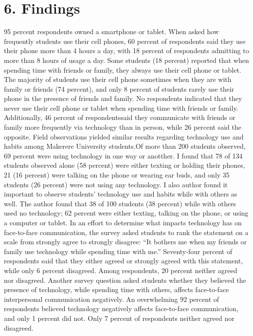\documentclass[11pt]{article} %
\begin{document}
\section{6. Findings}
95 percent respondents owned a smartphone or tablet. When asked how frequently students use their cell phones, 60 percent of respondents said they use their phone more than 4 hours a day, with 18 percent of respondents admitting to more than 8 hours of usage a day. Some students (18 percent) reported that when spending time with friends or family, they always use their cell phone or tablet. The majority of students use their cell phone sometimes when they are with family or friends (74 percent), and only 8 percent of students rarely use their phone in the presence of friends and family. No respondents indicated that they never use their cell phone or tablet when spending time with friends or family. Additionally, 46 percent of respondentssaid they communicate with friends or family more frequently via technology than in person, while 26 percent said the opposite.  
Field observations yielded similar results regarding technology use and habits among Makerere University students.Of more than 200 students observed, 69 percent were using technology in one way or anotther. I found that 78 of 134 students observed alone (58 percent) were either texting or holding their phones, 21 (16 percent) were talking on the phone or wearing ear buds, and only 35 students (26 percent) were not using any technology. 
I also author found it important to observe students’ technology use and habits while with others as well. The author found that 38 of 100 students (38 percent) while with others used no technology; 62 percent were either texting, talking on the phone, or using a computer or tablet. 
In an effort to determine what impacts technology has on face-to-face communication, the survey asked students to rank the statement on a scale from strongly agree to strongly disagree: “It bothers me when my friends or family use technology while spending time with me.” Seventy-four percent of respondents said that they either agreed or strongly agreed with this statement, while only 6 percent disagreed. Among respondents, 20 percent  neither agreed nor disagreed. 
Another survey question asked students whether they believed the presence of technology, while spending time with others, affects face-to-face interpersonal communication negatively. An overwhelming 92 percent of respondents believed technology negatively affects face-to-face communication, and only 1 percent did not. Only 7 percent of respondents neither agreed nor disagreed. 
\end{document}
